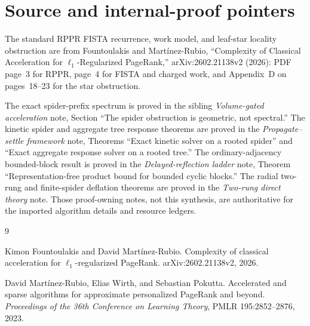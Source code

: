 \section*{Source and internal-proof pointers}

The standard RPPR FISTA recurrence, work model, and leaf-star locality
obstruction are from Fountoulakis and Mart{\'i}nez-Rubio, ``Complexity of
Classical Acceleration for $\ell_1$-Regularized PageRank,''
arXiv:2602.21138v2 (2026): PDF page~3 for RPPR, page~4 for FISTA and charged
work, and Appendix~D on pages~18--23 for the star obstruction.

The exact spider-prefix spectrum is proved in the sibling
\emph{Volume-gated acceleration} note, Section ``The spider obstruction is
geometric, not spectral.''  The kinetic spider and aggregate tree response
theorems are proved in the \emph{Propagate--settle framework} note, Theorems
``Exact kinetic solver on a rooted spider'' and ``Exact aggregate response
solver on a rooted tree.''  The ordinary-adjacency bounded-block result is
proved in the \emph{Delayed-reflection ladder} note, Theorem
``Representation-free product bound for bounded cyclic blocks.''
The radial two-rung and finite-spider deflation theorems are proved in the
\emph{Two-rung direct theory} note.  Those
proof-owning notes, not this synthesis, are authoritative for the imported
algorithm details and resource ledgers.

\begin{thebibliography}{9}

Kimon Fountoulakis and David Mart{\'i}nez-Rubio.
\newblock Complexity of classical acceleration for
$\ell_1$-regularized PageRank.
\newblock arXiv:2602.21138v2, 2026.

David Mart{\'i}nez-Rubio, Elias Wirth, and Sebastian Pokutta.
\newblock Accelerated and sparse algorithms for approximate personalized
PageRank and beyond.
\newblock \emph{Proceedings of the 36th Conference on Learning Theory},
PMLR 195:2852--2876, 2023.

\end{thebibliography}
